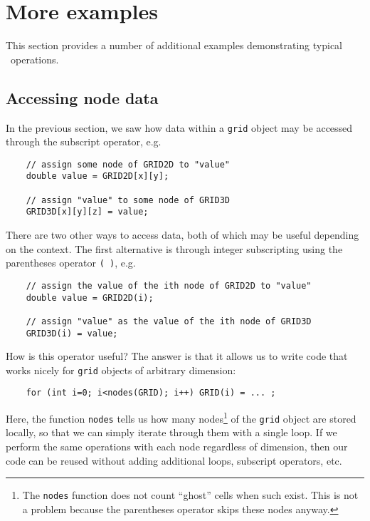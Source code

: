 \section{More examples}
This section provides a number of additional examples demonstrating typical \MMSP\ operations.

\subsection{Accessing node data}
In the previous section, we saw how data within a {\tt grid} object may be accessed through the subscript operator, e.g.
\begin{shadebox}
\begin{verbatim}
    // assign some node of GRID2D to "value"
    double value = GRID2D[x][y];

    // assign "value" to some node of GRID3D 
    GRID3D[x][y][z] = value;
\end{verbatim}
\end{shadebox}
There are two other ways to access data, both of which may be useful depending on the context.  The first alternative is through integer subscripting using the parentheses operator {\tt ( )}, e.g.
\begin{shadebox}
\begin{verbatim}
    // assign the value of the ith node of GRID2D to "value"
    double value = GRID2D(i);

    // assign "value" as the value of the ith node of GRID3D
    GRID3D(i) = value;
\end{verbatim}
\end{shadebox}
How is this operator useful?  The answer is that it allows us to write code that works nicely for {\tt grid} objects of arbitrary dimension:
\begin{shadebox}
\begin{verbatim}
    for (int i=0; i<nodes(GRID); i++) GRID(i) = ... ;
\end{verbatim}
\end{shadebox}
Here, the function {\tt nodes} tells us how many nodes\footnote{The {\tt nodes} function does not count ``ghost'' cells when such exist.  This is not a problem because the parentheses operator skips these nodes anyway.} of the {\tt grid} object are stored locally, so that we can simply iterate through them with a single loop.  If we perform the same operations with each node regardless of dimension, then our code can be reused without adding additional loops, subscript operators, etc.

